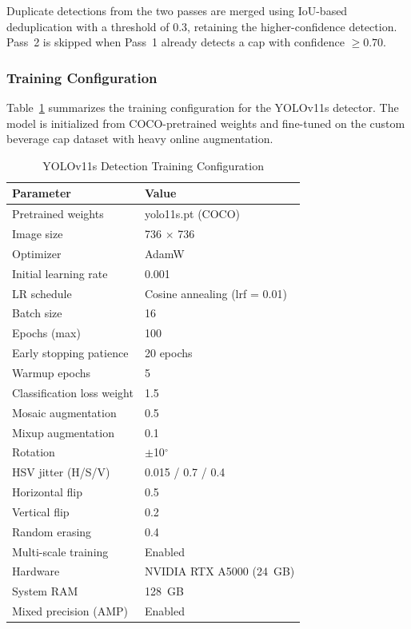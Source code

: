 \documentclass{ieeeaccess}
\begin{document}
Duplicate detections from the two passes are merged using IoU-based deduplication with a threshold of 0.3, retaining the higher-confidence detection. Pass~2 is skipped when Pass~1 already detects a cap with confidence $\geq 0.70$.

\subsubsection{Training Configuration}
Table~\ref{tab:yolov11_config} summarizes the training configuration for the YOLOv11s detector. The model is initialized from COCO-pretrained weights and fine-tuned on the custom beverage cap dataset with heavy online augmentation.

\begin{table}[!t]
\caption{YOLOv11s Detection Training Configuration}
\label{tab:yolov11_config}
\centering
\small
\begin{tabular}{ll}
\toprule
\textbf{Parameter} & \textbf{Value} \\
\midrule
Pretrained weights & yolo11s.pt (COCO) \\
Image size & 736 $\times$ 736 \\
Optimizer & AdamW \\
Initial learning rate & 0.001 \\
LR schedule & Cosine annealing (lrf = 0.01) \\
Batch size & 16 \\
Epochs (max) & 100 \\
Early stopping patience & 20 epochs \\
Warmup epochs & 5 \\
Classification loss weight & 1.5 \\
\midrule
Mosaic augmentation & 0.5 \\
Mixup augmentation & 0.1 \\
Rotation & $\pm$10$^\circ$ \\
HSV jitter (H/S/V) & 0.015 / 0.7 / 0.4 \\
Horizontal flip & 0.5 \\
Vertical flip & 0.2 \\
Random erasing & 0.4 \\
Multi-scale training & Enabled \\
\midrule
Hardware & NVIDIA RTX A5000 (24~GB) \\
System RAM & 128~GB \\
Mixed precision (AMP) & Enabled \\
\bottomrule
\end{tabular}
\end{table}
\end{document}
